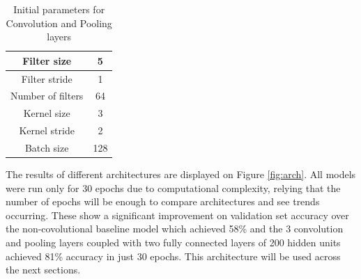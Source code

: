\documentclass[12pt]{article}
\begin{document}
\begin{table}[H]
\centering
\begin{tabular}[h]{| c | c |}
\hline
Filter size & 5  \\
\hline
Filter stride & 1   \\
\hline
Number of filters & 64   \\
\hline
Kernel size & 3   \\
\hline 
Kernel stride & 2   \\
\hline 
Batch size & 128   \\
\hline 
\end{tabular} 
\caption{Initial parameters for Convolution and Pooling layers}
\label{tab:convpoolpar}
\end{table}

The results of different architectures are displayed on Figure \ref{fig:arch}. All models were run only for 30 epochs due to computational complexity, relying that the number of epochs will be enough to compare architectures and see trends occurring. These show a significant improvement on validation set accuracy over the non-covolutional baseline model which achieved 58\% and the 3 convolution and pooling layers coupled with two fully connected layers of 200 hidden units achieved 81\% accuracy in just 30 epochs. This architecture will be used across the next sections.
\end{document}
